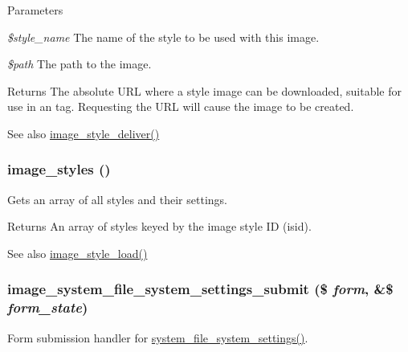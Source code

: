 \begin{DoxyParams}{Parameters}
\item[{\em \$style\_\-name}]The name of the style to be used with this image. \item[{\em \$path}]The path to the image.\end{DoxyParams}
\begin{DoxyReturn}{Returns}
The absolute URL where a style image can be downloaded, suitable for use in an  tag. Requesting the URL will cause the image to be created. 
\end{DoxyReturn}
\begin{DoxySeeAlso}{See also}
\hyperlink{image_8module_a80cd974ca58e2f9aaee8a655497d2db7}{image\_\-style\_\-deliver()} 
\end{DoxySeeAlso}
\hypertarget{image_8module_a2c68836c891747cbd10954b0acf34a71}{
\subsubsection[{image\_\-styles}]{\setlength{\rightskip}{0pt plus 5cm}image\_\-styles ()}}
\label{image_8module_a2c68836c891747cbd10954b0acf34a71}
Gets an array of all styles and their settings.

\begin{DoxyReturn}{Returns}
An array of styles keyed by the image style ID (isid). 
\end{DoxyReturn}
\begin{DoxySeeAlso}{See also}
\hyperlink{image_8module_a0d7388bec5f42788968823a8099a64a7}{image\_\-style\_\-load()} 
\end{DoxySeeAlso}
\hypertarget{image_8module_a440845d7f8654b992f5be1ed61dc7892}{
\subsubsection[{image\_\-system\_\-file\_\-system\_\-settings\_\-submit}]{\setlength{\rightskip}{0pt plus 5cm}image\_\-system\_\-file\_\-system\_\-settings\_\-submit (\$ {\em form}, \/  \&\$ {\em form\_\-state})}}
\label{image_8module_a440845d7f8654b992f5be1ed61dc7892}
Form submission handler for \hyperlink{group__forms_gab0199bde08bcb49ff536dd4987718632}{system\_\-file\_\-system\_\-settings()}.

